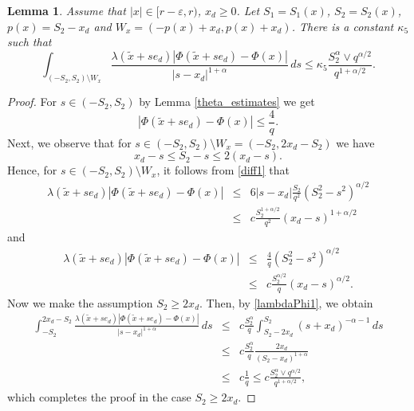 \documentclass[a4paper,12pt,reqno]{amsart}
\newtheorem{lemma}[theorem]{Lemma}
\theoremstyle{definition}
\theoremstyle{remark}
\newcommand{\eps}{\varepsilon}
\begin{document}
\begin{lemma}\label{Case2L}
Assume that $|x| \in [r - \eps, r)$, $x_d \ge 0$. Let $S_1= S_1(x)$, $S_2= S_2(x)$,
 $p(x)=S_2-x_d$ and $W_x = (-p(x)+x_d,p(x)+x_d) $. There is a constant $\kappa_5$ such that
$$ 
\int_{(-S_2, S_2) \setminus W_x}
\frac{\lambda(\tilde{x} + s e_d) |\varPhi(\tilde{x} + s e_d) - \varPhi(x)|}{|s - x_d|^{1 + \alpha}} \, ds 
\le \kappa_5 \frac{S^{\alpha}_2\vee q^{\alpha/2}}{q^{1+\alpha/2} }.
$$  
\end{lemma}
\begin{proof}
For $s \in (-S_2,S_2)$ by Lemma \ref{theta_estimates} we get
\begin{equation*} \label{diff3}
\left| \varPhi(\tilde{x} + s e_d) - \varPhi(x) \right| 
\le  \frac{4}{q }.
\end{equation*}
Next, we observe that for $s\in (-S_2,S_2)\setminus W_x= (-S_2, 2x_d-S_2)$ we have 
$$x_d-s\le S_2-s\le 2(x_d-s). $$
Hence, for $s\in(-S_2,S_2)\setminus W_x$, it follows from \eqref{diff1} that
\begin{eqnarray}
\lambda(\tilde{x} + s e_d) |\varPhi(\tilde{x} + s e_d) - \varPhi(x)|&\le& 6 |s-x_d| \frac{S_2}{q^{2} }(S^2_2-s^2)^{\alpha/2}\nonumber\\
&\le& c \frac{S^{1+\alpha/2}_2}{q^{2} }(x_d-s)^{1+\alpha/2}\label{lambdaPhi}\end{eqnarray}
and
\begin{eqnarray}
\lambda(\tilde{x} + s e_d) |\varPhi(\tilde{x} + s e_d) - \varPhi(x)|&\le&\frac{4}{q }(S^2_2-s^2)^{\alpha/2}\nonumber\\
&\le&c \frac{S^{\alpha/2}_2}{q }(x_d-s)^{\alpha/2}.\label{lambdaPhi1}
\end{eqnarray}
Now we make the assumption $S_2\ge 2x_d$. Then, by \eqref{lambdaPhi1}, we obtain
\begin{eqnarray*}
\int_{-S_2}^{2x_d-S_2} 
\frac{\lambda(\tilde{x} + s e_d) |\varPhi(\tilde{x} + s e_d) - \varPhi(x)|}{|s - x_d|^{1 + \alpha}} \, ds 
&\le&  c\frac{S^{\alpha}_2}{q }\int_{S_2- 2x_d}^{S_2} (s+x_d)^{-\alpha-1}\, ds\\
&\le& c\frac{S^{\alpha}_2}{q }\frac {2x_d} {(S_2- x_d)^{1+\alpha}} \\
&\le& c\frac{1}{q } 
\le c\frac{S^{\alpha}_2\vee q^{\alpha/2}}{q^{1+\alpha/2} }, 
\end{eqnarray*}
which completes the proof in the case $S_2\ge 2x_d$. 


\end{proof}
\end{document}
